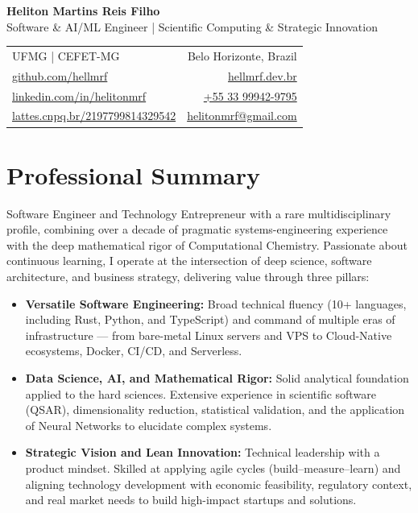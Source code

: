\documentclass[10pt,a4paper]{article}
\begin{document}
{\Huge \textbf{Heliton Martins Reis Filho}}\\[0.3em]

{\large Software \& AI/ML Engineer | Scientific Computing \& Strategic Innovation}\\[0.4em]

{\ttfamily
\begin{tabularx}{\textwidth}{@{}X r@{}}
UFMG | CEFET-MG & Belo Horizonte, Brazil \\
\href{https://github.com/hellmrf}{github.com/hellmrf} & \href{https://hellmrf.dev.br/en}{hellmrf.dev.br} \\
\href{https://www.linkedin.com/in/helitonmrf/}{linkedin.com/in/helitonmrf} & \href{https://wa.me/5533999429795}{+55 33 99942-9795} \\
\href{https://lattes.cnpq.br/2197799814329542}{lattes.cnpq.br/2197799814329542}& \href{mailto:helitonmrf@gmail.com}{helitonmrf@gmail.com} \\
\end{tabularx}
}
\section*{Professional Summary}
Software Engineer and Technology Entrepreneur with a rare multidisciplinary profile, combining over a decade of pragmatic systems-engineering experience with the deep mathematical rigor of Computational Chemistry. Passionate about continuous learning, I operate at the intersection of deep science, software architecture, and business strategy, delivering value through three pillars:

\begin{itemize}[leftmargin=1.5em, itemsep=0.4em]
    \item \textbf{Versatile Software Engineering:}
    Broad technical fluency (10+ languages, including Rust, Python, and TypeScript) and command of multiple eras of infrastructure --- from bare-metal Linux servers and VPS to Cloud-Native ecosystems, Docker, CI/CD, and Serverless.

    \item \textbf{Data Science, AI, and Mathematical Rigor:}
    Solid analytical foundation applied to the hard sciences. Extensive experience in scientific software (QSAR), dimensionality reduction, statistical validation, and the application of Neural Networks to elucidate complex systems.

    \item \textbf{Strategic Vision and Lean Innovation:}
    Technical leadership with a product mindset. Skilled at applying agile cycles (build--measure--learn) and aligning technology development with economic feasibility, regulatory context, and real market needs to build high-impact startups and solutions.
\end{itemize}
\end{document}
